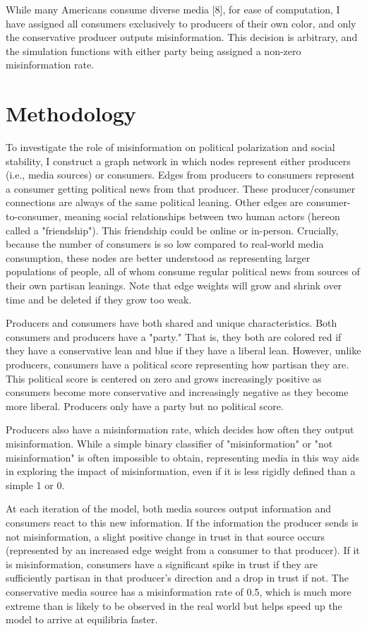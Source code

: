 \documentclass[titlepage, 12pt, leqno]{article}
\begin{document}
While many Americans consume diverse media [8], for ease of computation, I have assigned all consumers exclusively to producers of their own color, and only the conservative producer outputs misinformation. This decision is arbitrary, and the simulation functions with either party being assigned a non-zero misinformation rate.

\pagebreak
\section{Methodology}
To investigate the role of misinformation on political polarization and social stability, I construct a graph network in which nodes represent either producers (i.e., media sources) or consumers. Edges from producers to consumers represent a consumer getting political news from that producer. These producer/consumer connections are always of the same political leaning. Other edges are consumer-to-consumer, meaning social relationships between two human actors (hereon called a "friendship"). This friendship could be online or in-person. Crucially, because the number of consumers is so low compared to real-world media consumption, these nodes are better understood as representing larger populations of people, all of whom consume regular political news from sources of their own partisan leanings. Note that edge weights will grow and shrink over time and be deleted if they grow too weak.

Producers and consumers have both shared and unique characteristics. Both consumers and producers have a "party." That is, they both are colored red if they have a conservative lean and blue if they have a liberal lean. However, unlike producers, consumers have a political score representing how partisan they are. This political score is centered on zero and grows increasingly positive as consumers become more conservative and increasingly negative as they become more liberal. Producers only have a party but no political score.

Producers also have a misinformation rate, which decides how often they output misinformation. While a simple binary classifier of "misinformation" or "not misinformation" is often impossible to obtain, representing media in this way aids in exploring the impact of misinformation, even if it is less rigidly defined than a simple 1 or 0.

At each iteration of the model, both media sources output information and consumers react to this new information. If the information the producer sends is not misinformation, a slight positive change in trust in that source occurs (represented by an increased edge weight from a consumer to that producer). If it is misinformation, consumers have a significant spike in trust if they are sufficiently partisan in that producer's direction and a drop in trust if not. The conservative media source has a misinformation rate of 0.5, which is much more extreme than is likely to be observed in the real world but helps speed up the model to arrive at equilibria faster.
\end{document}
